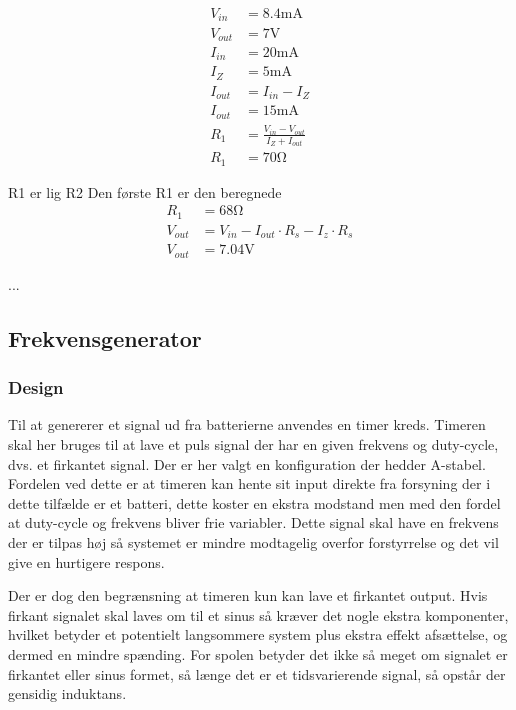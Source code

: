 	
	\begin{align}
	V_{in} & = 8.4 \si{\milli\ampere} \nonumber \\
	V_{out} & = 7 \si{\volt} \nonumber \\
	I_{in} & = 20\si{\milli\ampere} \nonumber \\
	I_Z & = 5 \si{\milli\ampere} \nonumber \\
	I_{out} & = I_{in} - I_Z \\
	I_{out} & = 15 \si{\milli\ampere} \nonumber \\
	R_1 & = \frac{V_{in} - V_{out}}{I_Z + I_{out}} \label{eq:RegulatorModstand} \\
	R_1 & = 70 \si{\ohm} \nonumber \label{eq:RegulatorModstandBeregnet}
	\end{align}
	
	R1 er lig R2
	Den første R1 er den beregnede
	\begin{align}
	R_1 & = 68 \si{\ohm} \nonumber \\
	V_{out} & = V_{in} - I_{out} \cdot R_s - I_z \cdot R_s \\
	V_{out} & = 7.04 \si{\volt} \label{eq:RegulatorBeregnetPotentiale} 
	\end{align}
	



...

\subsection{Frekvensgenerator}
\subsubsection{Design}
Til at genererer et signal ud fra batterierne anvendes en timer kreds. 
Timeren skal her bruges til at lave et puls signal der har en given frekvens og duty-cycle, dvs. et firkantet signal. 
Der er her valgt en konfiguration der hedder A-stabel. 
Fordelen ved dette er at timeren kan hente sit input direkte fra forsyning der i dette tilfælde er et batteri, dette koster en ekstra modstand men med den fordel at duty-cycle og frekvens bliver frie variabler. 
Dette signal skal have en frekvens der er tilpas høj så systemet er mindre modtagelig overfor forstyrrelse og det vil give en hurtigere respons. \\

Der er dog den begrænsning at timeren kun kan lave et firkantet output. 
Hvis firkant signalet skal laves om til et sinus så kræver det nogle ekstra komponenter, hvilket betyder et potentielt langsommere system plus ekstra effekt afsættelse, og dermed en mindre spænding. For spolen betyder det ikke så meget om signalet er firkantet eller sinus formet, så længe det er et tidsvarierende signal, så opstår der gensidig induktans.

